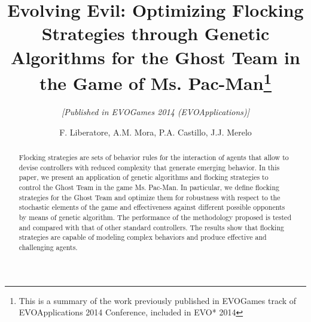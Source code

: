 \documentclass[a4paper]{llncs}
\newcommand{\keywords}[1]{\par\addvspace\baselineskip
\noindent\keywordname\enspace\ignorespaces#1}
\begin{document}
\mainmatter

%
%

\title{Evolving Evil: Optimizing Flocking Strategies through Genetic Algorithms for the Ghost Team in the Game of Ms. Pac-Man\thanks{This is a summary of the work \cite{flocking_ghosts-evo14} previously published in EVOGames track of EVOApplications 2014 Conference, included in EVO* 2014}}
\subtitle{\textit{[Published in EVOGames 2014 (EVOApplications)]}}

%
%

\author{F. Liberatore, A.M. Mora, P.A. Castillo, J.J. Merelo}

\maketitle

%
%
\begin{abstract} 
Flocking strategies are sets of behavior rules for the interaction of agents that allow to devise controllers with reduced complexity that generate emerging behavior. In this paper, we present an application of genetic algorithms and flocking strategies to control the Ghost Team in the game Ms. Pac-Man. In particular, we define flocking strategies for the Ghost Team and optimize them for robustness with respect to the stochastic elements of the game and effectiveness against different possible opponents by means of genetic algorithm. The performance of the methodology proposed is tested and compared with that of other standard controllers. The results show that flocking strategies are capable of modeling complex behaviors and produce effective and challenging agents.

\end{abstract}

%
%
\end{document}
